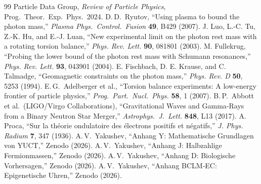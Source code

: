 \documentclass[12pt,a4paper]{article}
\begin{document}
	\begin{thebibliography}{99}
		 Particle Data Group, \emph{Review of Particle Physics}, Prog.\ Theor.\ Exp.\ Phys.\ 2024.
		 D.\,D.\ Ryutov, ``Using plasma to bound the photon mass,'' \emph{Plasma Phys.\ Control.\ Fusion} \textbf{49}, B429 (2007).
		 J. Luo, L.-C. Tu, Z.-K. Hu, and E.-J. Luan, ``New experimental limit on the photon rest mass with a rotating torsion balance,'' \emph{Phys. Rev. Lett.} \textbf{90}, 081801 (2003).
		 M. Fullekrug, ``Probing the lower bound of the photon rest mass with Schumann resonances,'' \emph{Phys. Rev. Lett.} \textbf{93}, 043901 (2004).
		 E. Fischbach, D. E. Krause, and C. Talmadge, ``Geomagnetic constraints on the photon mass,'' \emph{Phys. Rev. D} \textbf{50}, 5253 (1994).
		 E.\,G.\ Adelberger et al., ``Torsion balance experiments: A low‑energy frontier of particle physics,'' \emph{Prog.\ Part.\ Nucl.\ Phys.} \textbf{58}, 1 (2007).
		 B.\,P.\ Abbott et al.\ (LIGO/Virgo Collaborations), ``Gravitational Waves and Gamma‑Rays from a Binary Neutron Star Merger,'' \emph{Astrophys.\ J.\ Lett.} \textbf{848}, L13 (2017).
		 A. Proca, ``Sur la théorie ondulatoire des électrons positifs et négatifs,'' \emph{J. Phys. Radium} \textbf{7}, 347 (1936).
		 A.\,V.\ Yakushev, ``Anhang Y: Mathematische Grundlagen von YUCT,'' Zenodo (2026).
		 A.\,V.\ Yakushev, ``Anhang J: Halbzahlige Fermionmassen,'' Zenodo (2026).
		 A.\,V.\ Yakushev, ``Anhang D: Biologische Vorhersagen,'' Zenodo (2026).
		 A.\,V.\ Yakushev, ``Anhang BCLM‑EC: Epigenetische Uhren,'' Zenodo (2026).
	\end{thebibliography}
	
\end{document}
